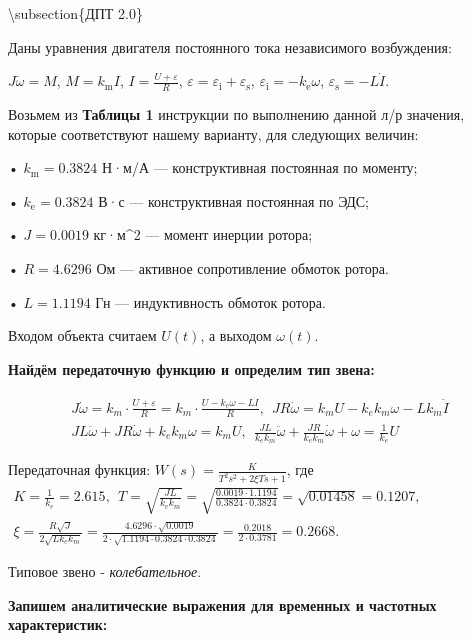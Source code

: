 \textbackslash{}subsection\{ДПТ 2.0\}

Даны уравнения двигателя постоянного тока независимого возбуждения:

$J\dot{\omega} =M$, $M=k_{\text{m}} I$, $I=\frac{U+\varepsilon }{R}$, $\varepsilon =\varepsilon_{\text{i}} +\varepsilon_{\text{s}}$, $\varepsilon_{\text{i}} =-k_{\text{e}} \omega$, $\varepsilon_{\text{s}} =-L\dot{I}$.

Возьмем из \textbf{Таблицы 1} инструкции по выполнению данной л/р значения, которые соответствуют нашему варианту, для следующих величин:

• $k_{\text{m}} =0.3824$ Н·м/А — конструктивная постоянная по моменту;

• $k_{\text{e}} =0.3824$ В·с — конструктивная постоянная по ЭДС;

• $J=0.0019$ кг·м\textasciicircum{}2 — момент инерции ротора;

• $R=4.6296$ Ом — активное сопротивление обмоток ротора.

• $L=1.1194$ Гн — индуктивность обмоток ротора.

Входом объекта считаем $U(t)$, а выходом $\omega (t)$.

\textbf{Найдём передаточную функцию и определим тип звена:}

\begin{par}
 $$\begin{array}{l}
J\dot{\omega} =k_m \cdot \frac{U+\varepsilon }{R}=k_m \cdot \frac{U-k_e \omega -L\dot{I} }{R},~~JR\dot{\omega} =k_m U-k_e k_m \omega -Lk_m \dot{I} \\
JL\ddot{\omega} +JR\dot{\omega} +k_e k_m \omega =k_m U,~~\frac{JL}{k_e k_m }\ddot{\omega} +\frac{JR}{k_e k_m }\dot{\omega} +\omega =\frac{1}{k_e }U
\end{array}$$
\end{par}

Передаточная функция: $W(s)=\frac{K}{T^2 s^2 +2\xi Ts+1}$, где $\begin{array}{l}
K=\frac{1}{k_e }=2.615,~~T=\sqrt{\frac{JL}{k_e k_m }}=\sqrt{\frac{0.0019\cdot 1.1194}{0.3824\cdot 0.3824}}=\sqrt{0.01458}=0.1207,\\
\xi =\frac{R\sqrt{J}}{2\sqrt{Lk_e k_m }}=\frac{4.6296\cdot \sqrt{0.0019}}{2\cdot \sqrt{1.1194\cdot 0.3824\cdot 0.3824}}=\frac{0.2018}{2\cdot 0.3781}=0.2668.
\end{array}$

Типовое звено - \textit{колебательное}.

\textbf{Запишем аналитические выражения для временных и частотных характеристик:}

